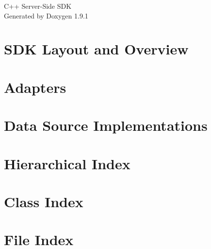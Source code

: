 \let\mypdfximage\pdfximage\def\pdfximage{\immediate\mypdfximage}\documentclass[twoside]{book}
\newcommand{\+}{\discretionary{\mbox{\scriptsize$\hookleftarrow$}}{}{}}
\newcommand{\clearemptydoublepage}{%
  \newpage{\pagestyle{empty}\cleardoublepage}%
}
\begin{document}
\raggedbottom

\hypersetup{pageanchor=false,
             bookmarksnumbered=true,
             pdfencoding=unicode
            }
\begin{titlepage}
\vspace*{7cm}
\begin{center}%
{\Large C++ Server-\/\+Side SDK }\\
\vspace*{1cm}
{\large Generated by Doxygen 1.9.1}\\
\end{center}
\end{titlepage}
\clearemptydoublepage
{}
\tableofcontents
\clearemptydoublepage
{}
\hypersetup{pageanchor=true}

\chapter{SDK Layout and Overview}
\label{index}\hypertarget{index}{}
\chapter{Adapters}
\label{md_src_data_components_serialization_adapters_README}

\chapter{Data Source Implementations}
\label{md_src_data_systems_background_sync_sources_README}

\chapter{Hierarchical Index}

\chapter{Class Index}

\chapter{File Index}

\end{document}
